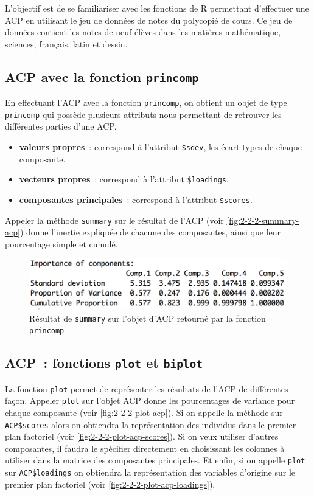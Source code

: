 \documentclass[a4paper,10pt]{report}
\begin{document}
L'objectif est de se familiariser avec les fonctions de R permettant d'effectuer une ACP en utilisant le jeu de données de notes du polycopié de cours. Ce jeu de données contient les notes de neuf élèves dans les matières mathématique, sciences, français, latin et dessin.


\subsection{ACP avec la fonction \texttt{princomp}}

En effectuant l'ACP avec la fonction \texttt{princomp}, on obtient un objet de type \texttt{princomp} qui possède plusieurs attributs nous permettant de retrouver les différentes parties d'une ACP.

\begin{itemize}
	\item \textbf{valeurs propres}~: correspond à l'attribut \texttt{\$sdev}, les écart types de chaque composante.
	\item \textbf{vecteurs propres}~: correspond à l'attribut \texttt{\$loadings}.
	\item \textbf{composantes principales}~: correspond à l'attribut \texttt{\$scores}.
\end{itemize}

Appeler la méthode \texttt{summary} sur le résultat de l'ACP (voir \autoref{fig:2-2-2-summary-acp}) donne l'inertie expliquée de chacune des composantes, ainsi que leur pourcentage simple et cumulé.

\begin{figure}[H]
	\centering
	\captionsetup{justification=centering, margin=2cm}
	\includegraphics[width=.5\linewidth]{img/2-2-2-summary-acp}
	\caption{\scriptsize Résultat de \texttt{summary} sur l'objet d'ACP retourné par la fonction \texttt{princomp}}
	\label{fig:2-2-2-summary-acp}
\end{figure}

\subsection{ACP~: fonctions \texttt{plot} et \texttt{biplot}}

La fonction \texttt{plot} permet de représenter les résultats de l'ACP de différentes façon. Appeler \texttt{plot} sur l'objet ACP donne les pourcentages de variance pour chaque composante (voir \autoref{fig:2-2-2-plot-acp}). Si on appelle la méthode sur \texttt{ACP\$scores} alors on obtiendra la représentation des individus dans le premier plan factoriel (voir \autoref{fig:2-2-2-plot-acp-scores}). Si on veux utiliser d'autres composantes, il faudra le spécifier directement en choisissant les colonnes à utiliser dans la matrice des composantes principales. Et enfin, si on appelle \texttt{plot} sur \texttt{ACP\$loadings} on obtiendra la représentation des variables d'origine sur le premier plan factoriel (voir \autoref{fig:2-2-2-plot-acp-loadings}).
\end{document}
